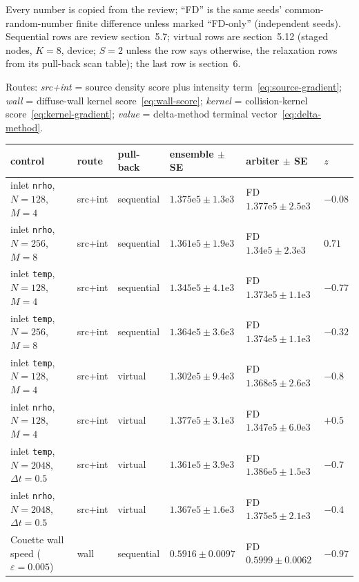 \documentclass[11pt,a4paper]{article}
\numberwithin{equation}{section}
\newcommand{\code}[1]{\texttt{#1}}
\begin{document}
Every number is copied from the review; ``FD'' is the same seeds' common-random-number
finite difference unless marked ``FD-only'' (independent seeds).  Sequential rows are
review section~5.7; virtual rows are section~5.12 (staged nodes, $K = 8$, device; $S = 2$
unless the row says otherwise, the relaxation rows from its pull-back scan table);
the last row is section~6.

Routes: \emph{src+int} = source density score plus intensity term~\eqref{eq:source-gradient};
\emph{wall} = diffuse-wall kernel score~\eqref{eq:wall-score}; \emph{kernel} = collision-kernel
score~\eqref{eq:kernel-gradient}; \emph{value} = delta-method terminal vector~\eqref{eq:delta-method}.
\begin{center}
\scriptsize
\begin{tabular}{llllll}
\hline
control & route & pull-back & ensemble $\pm$ SE & arbiter $\pm$ SE & $z$ \\
\hline
inlet \code{nrho}, $N{=}128$, $M{=}4$ & src+int & sequential & $1.375\mathrm{e}5 \pm 1.3\mathrm{e}3$ & FD $1.377\mathrm{e}5 \pm 2.5\mathrm{e}3$ & $-0.08$ \\
inlet \code{nrho}, $N{=}256$, $M{=}8$ & src+int & sequential & $1.361\mathrm{e}5 \pm 1.9\mathrm{e}3$ & FD $1.34\mathrm{e}5 \pm 2.3\mathrm{e}3$ & $0.71$ \\
inlet \code{temp}, $N{=}128$, $M{=}4$ & src+int & sequential & $1.345\mathrm{e}5 \pm 4.1\mathrm{e}3$ & FD $1.373\mathrm{e}5 \pm 1.1\mathrm{e}3$ & $-0.77$ \\
inlet \code{temp}, $N{=}256$, $M{=}8$ & src+int & sequential & $1.364\mathrm{e}5 \pm 3.6\mathrm{e}3$ & FD $1.374\mathrm{e}5 \pm 1.1\mathrm{e}3$ & $-0.32$ \\
inlet \code{temp}, $N{=}128$, $M{=}4$ & src+int & virtual & $1.302\mathrm{e}5 \pm 9.4\mathrm{e}3$ & FD $1.368\mathrm{e}5 \pm 2.6\mathrm{e}3$ & $-0.8$ \\
inlet \code{nrho}, $N{=}128$, $M{=}4$ & src+int & virtual & $1.377\mathrm{e}5 \pm 3.1\mathrm{e}3$ & FD $1.347\mathrm{e}5 \pm 6.0\mathrm{e}3$ & $+0.5$ \\
inlet \code{temp}, $N{=}2048$, $\Delta t{=}0.5$ & src+int & virtual & $1.361\mathrm{e}5 \pm 3.9\mathrm{e}3$ & FD $1.386\mathrm{e}5 \pm 1.5\mathrm{e}3$ & $-0.7$ \\
inlet \code{nrho}, $N{=}2048$, $\Delta t{=}0.5$ & src+int & virtual & $1.367\mathrm{e}5 \pm 1.6\mathrm{e}3$ & FD $1.375\mathrm{e}5 \pm 2.1\mathrm{e}3$ & $-0.4$ \\
Couette wall speed ($\varepsilon{=}0.005$) & wall & sequential & $0.5916 \pm 0.0097$ & FD $0.5999 \pm 0.0062$ & $-0.97$ \\

\end{tabular}
\end{center}
\end{document}

